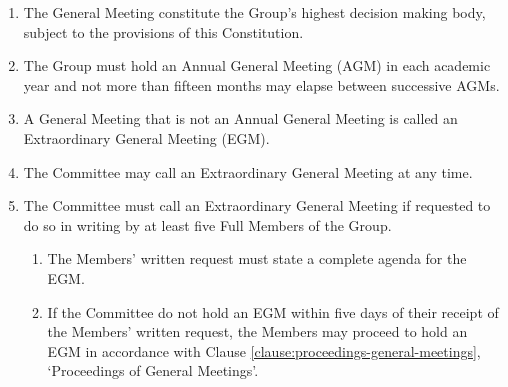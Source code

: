 \documentclass[12pt]{constitution}
\begin{document}

\label{clause:general-meetings}

\begin{enumerate}
    \item The General Meeting constitute the Group's highest decision ­making body, subject to the provisions of this Constitution.
    \item The Group must hold an Annual General Meeting (AGM) in each academic year and not more than fifteen months may elapse between successive AGMs.
    \item A General Meeting that is not an Annual General Meeting is called an Extraordinary General Meeting (EGM).
    \item The Committee may call an Extraordinary General Meeting at any time.
    \item The Committee must call an Extraordinary General Meeting if requested to do so in writing by at least five Full Members of the Group.
    \begin{enumerate}
        \item The Members' written request must state a complete agenda for the EGM.
        \item If the Committee do not hold an EGM within five days of their receipt of the Members' written request, the Members may proceed to hold an EGM in accordance with Clause \ref{clause:proceedings-general-meetings}, `Proceedings of General Meetings'.
    \end{enumerate}
\end{enumerate}


\label{clause:proceedings-general-meetings}
\end{document}
